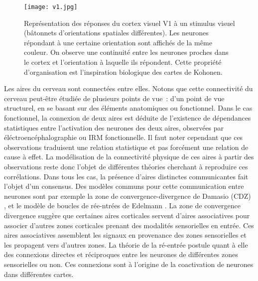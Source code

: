 \documentclass[../main]{subfiles}
\begin{document}
\begin{figure}
\centering
\texttt{[image: v1.jpg]}
\caption{Représentation des réponses du cortex visuel V1 à un stimulus visuel (bâtonnets d'orientations spatiales différentes). Les neurones répondant à une certaine orientation sont affichés de la même couleur. On observe une continuité entre les neurones proches dans le cortex et l'orientation à laquelle ils répondent. Cette propriété d'organisation est l'inspiration biologique des cartes de Kohonen.}
\label{fig:v1}
\end{figure}


Les aires du cerveau sont connectées entre elles. Notons que cette connectivité du cerveau peut-être étudiée de plusieurs points de vue~: d'un point de vue structurel, en se basant sur des éléments anatomiques ou fonctionnel.
Dans le cas fonctionnel, la connexion de deux aires est déduite de l'existence de dépendances statistiques entre l'activation des neurones des deux aires, observées par éléctroencéphalographie ou IRM fonctionnelle. Il faut noter cependant que ces observations traduisent une relation statistique et pas forcément une relation de cause à effet. 
La modélisation de la connectivité physique de ces aires à partir des observations reste donc l'objet de différentes théories cherchant à reproduire ces corrélations. 
Dans tous les cas, la présence d'aires distinctes communicantes fait l'objet d'un consensus.
Des modèles communs pour cette communication entre neurones sont par exemple la zone de convergence-divergence de Damasio (CDZ) \cite{damasio_time-locked_1989}, et le modèle de boucles de rée-ntrées de Edelmann \cite{Edelman1982GroupSA}.
La zone de convergence divergence suggère que certaines aires corticales servent d'aires associatives pour associer d'autres zones corticales prenant des modalités sensorielles en entrée. Ces aires associatives assemblent les signaux en provenance des zones sensorielles et les propagent vers d'autres zones. 
La théorie de la ré-entrée postule quant à elle des connexions directes et réciproques entre les neurones de différentes zones sensorielles ou non. Ces connexions sont à l'origine de la coactivation de neurones dans différentes cartes.
\end{document}
